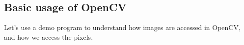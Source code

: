 \subsection{Basic usage of OpenCV}
Let's use a demo program to understand how images are accessed in OpenCV, and how we access the pixels.
